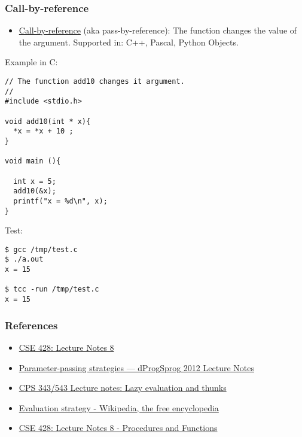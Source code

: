 \documentclass[11pt]{article}
\begin{document}
\subsubsection{Call-by-reference}
\label{sec-1-2-4}

\begin{itemize}
\item \uline{Call-by-reference} (aka pass-by-reference): The function changes
the value of the argument. Supported in: C++, Pascal, Python
Objects.
\end{itemize}

Example in C:

\begin{verbatim}
// The function add10 changes it argument.
//
#include <stdio.h>

void add10(int * x){
  *x = *x + 10 ;
}

void main (){
  
  int x = 5;
  add10(&x);
  printf("x = %d\n", x);  
}
\end{verbatim}

Test:

\begin{verbatim}
$ gcc /tmp/test.c
$ ./a.out 
x = 15

$ tcc -run /tmp/test.c
x = 15
\end{verbatim}

\subsubsection{References}
\label{sec-1-2-5}

\begin{itemize}
\item \href{http://www.lix.polytechnique.fr/~catuscia/teaching/cg428/02Spring/lecture_notes/L07.1.html}{CSE 428: Lecture Notes 8}
\item \href{http://users-cs.au.dk/danvy/dProgSprog12/Lecture-notes/parameter-passing-strategies.html}{Parameter-passing strategies — dProgSprog 2012 Lecture Notes}
\item \href{http://academic.udayton.edu/saverioperugini/courses/cps343/lecture_notes/lazyevaluation.html}{CPS 343/543 Lecture notes: Lazy evaluation and thunks}
\item \href{https://en.wikipedia.org/wiki/Evaluation_strategy#Strict_evaluation}{Evaluation strategy - Wikipedia, the free encyclopedia}
\item \href{http://www.lix.polytechnique.fr/~catuscia/teaching/cg428/02Spring/lecture_notes/L07.1.html}{CSE 428: Lecture Notes 8 - Procedures and Functions}
\end{itemize}
\end{document}
